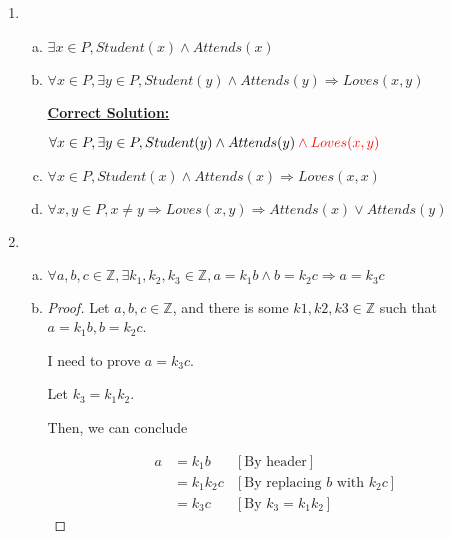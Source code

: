 \documentclass[12pt]{article}
\begin{document}
\begin{enumerate}[1.]
\begin{enumerate}[a)]
    \end{enumerate}

    \item

    \begin{enumerate}[a)]
        \item $\exists x \in P, Student(x) \land Attends(x)$
        \item $\forall x \in P, \exists y \in P, Student(y) \land Attends(y) \Rightarrow Loves(x,y)$

        \bigskip

        \begin{mdframed}
            \underline{\textbf{Correct Solution:}}

            \bigskip

            $\forall x \in P, \exists y \in P, Student(y) \land Attends(y) \color{red} \land Loves(x,y)$
        \end{mdframed}

        \item $\forall x \in P, Student(x) \land Attends(x) \Rightarrow Loves(x,x)$
        \item $\forall x,y \in P, x \neq y \Rightarrow Loves(x,y) \Rightarrow Attends(x) \lor Attends(y)$
    \end{enumerate}

    \item

    \begin{enumerate}[a)]
        \item $\forall a,b,c \in \mathbb{Z}, \exists k_1, k_2, k_3 \in \mathbb{Z}, a = k_1b \land b = k_2c \Rightarrow a = k_3c$
        \item

        \begin{proof}
        Let $a,b,c \in \mathbb{Z}$, and there is some $k1,k2,k3 \in \mathbb{Z}$ such that
        $a = k_1b, b = k_2c$.

        \bigskip

        I need to prove $a = k_3 c$.

        \bigskip

        Let $k_3 = k_1k_2$.

        \bigskip

        Then, we can conclude

        \begin{align}
            a &= k_1b    & [\text{By header}]\\
            &= k_1k_2c    & [\text{By replacing $b$ with $k_2c$}]\\
            &= k_3c    & [\text{By $k_3 = k_1k_2$}]
        \end{align}
        \end{proof}
    \end{enumerate}


\end{enumerate}
\end{document}
